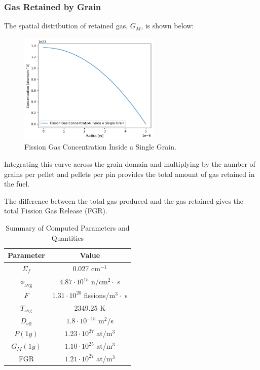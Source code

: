 \subsubsection{Gas Retained by Grain}

The spatial distribution of retained gas, $G_M$, is shown below:
\begin{figure}[H]
    \centering
    \includegraphics[width=0.6\textwidth]{FGR_2.png}
    \caption{Fission Gas Concentration Inside a Single Grain.}
    \label{fig:FGR_2}
\end{figure}

Integrating this curve across the grain domain and multiplying by the number of grains per pellet and pellets per pin provides the total amount of gas retained in the fuel.

The difference between the total gas produced and the gas retained gives the total Fission Gas Release (FGR).

\begin{table}[H]
    \centering
    \caption{Summary of Computed Parameters and Quantities}
    \begin{tabular}{|c|c|}
        \hline
        \textbf{Parameter} & \textbf{Value} \\
        \hline
        $\Sigma_f$ & 0.027 cm$^{-1}$ \\
        $\phi_{\text{avg}}$ & $4.87 \cdot 10^{15}$ n/cm$^2 \cdot$ s \\
        $\dot{F}$ & $1.31 \cdot 10^{20}$ fissions/m$^3 \cdot$ s \\
        $T_{\text{avg}}$ & 2349.25 K \\
        $D_{\text{eff}}$ & $1.8 \cdot 10^{-15}$ m$^2$/s \\
        $P(1y)$ & $1.23 \cdot 10^{27}$ at/m$^3$ \\
        $G_M(1y)$ & $1.10 \cdot 10^{25}$ at/m$^3$ \\
        FGR & $1.21 \cdot 10^{27}$ at/m$^3$ \\
        \hline
    \end{tabular}
    \label{tab:fgr_summary}
\end{table}

